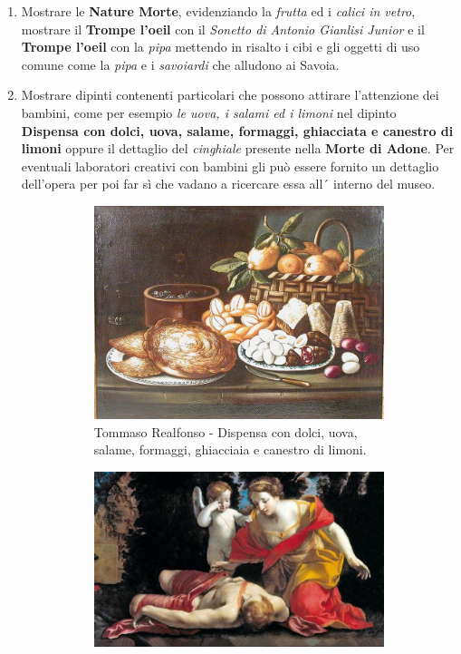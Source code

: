 \documentclass[12pt,a4paper]{article}
\begin{document}
\begin{enumerate}
	\item Mostrare le \textbf{Nature Morte}, evidenziando la \textit{frutta} ed i \textit{calici in vetro}, mostrare il \textbf{Trompe l'oeil} con il \textit{Sonetto di Antonio Gianlisi Junior} e il \textbf{Trompe l'oeil} con la \textit{pipa} mettendo in risalto i cibi e gli oggetti di uso comune come la \textit{pipa} e i \textit{savoiardi} che alludono ai Savoia.
	\item Mostrare dipinti contenenti particolari che possono attirare l'attenzione dei bambini, come per esempio \textit{le uova, i salami ed i limoni} nel dipinto \textbf{Dispensa con dolci, uova, salame, formaggi, ghiacciata e canestro di limoni} oppure il dettaglio del \textit{cinghiale} presente nella \textbf{Morte di Adone}.
	Per eventuali laboratori creativi con bambini gli può essere fornito un dettaglio dell'opera per poi far sì che vadano a ricercare essa all´ interno del museo.
	\begin{figure}[h]
		\centering
		\begin{subfigure} [h]{0.4\textwidth}
			\centering
			\includegraphics[]{Dispensa_natura_morta.jpg}
			\caption{Tommaso Realfonso - Dispensa con dolci, uova, salame, formaggi, ghiacciaia e canestro di limoni.}
		\end{subfigure}
	\hfill
		\begin{subfigure}[h] {0.4\textwidth}
			\centering
			\includegraphics[scale=0.3]{Morte_di_Adone.jpg}

\end{subfigure}
\end{figure}
\end{enumerate}
\end{document}
